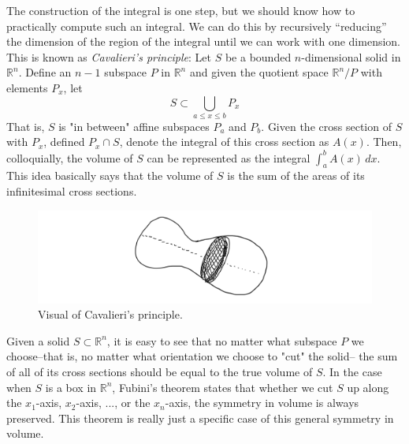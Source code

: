   The construction of the integral is one step, but we should know how to practically compute such an integral. We can do this by recursively ``reducing'' the dimension of the region of the integral until we can work with one dimension. This is known as \textit{Cavalieri's principle}: Let $S$ be a bounded $n$-dimensional solid in $\mathbb{R}^n$. Define an $n-1$ subspace $P$ in $\mathbb{R}^n$ and given the quotient space $\mathbb{R}^n / P$ with elements $P_x$, let 
  \begin{equation}
    S \subset \bigcup_{a \leq x \leq b} P_x
  \end{equation}
  That is, $S$ is "in between" affine subspaces $P_a$ and $P_b$. Given the cross section of $S$ with $P_x$, defined $P_x \cap S$, denote the integral of this cross section as $A(x)$. Then, colloquially, the volume of $S$ can be represented as the integral $\int_a^b A(x)\,dx$. This idea basically says that the volume of $S$ is the sum of the areas of its infinitesimal cross sections. 

  \begin{figure}[H]
    \centering 
    \includegraphics[scale=0.27]{img/Cavalieri_Principle.PNG}
    \caption{Visual of Cavalieri's principle.} 
    \label{fig:cavalieri}
  \end{figure}

  Given a solid $S \subset \mathbb{R}^n$, it is easy to see that no matter what subspace $P$ we choose–that is, no matter what orientation we choose to "cut" the solid– the sum of all of its cross sections should be equal to the true volume of $S$. In the case when $S$ is a box in $\mathbb{R}^n$, Fubini's theorem states that whether we cut $S$ up along the $x_1$-axis, $x_2$-axis, ..., or the $x_n$-axis, the symmetry in volume is always preserved. This theorem is really just a specific case of this general symmetry in volume. 

